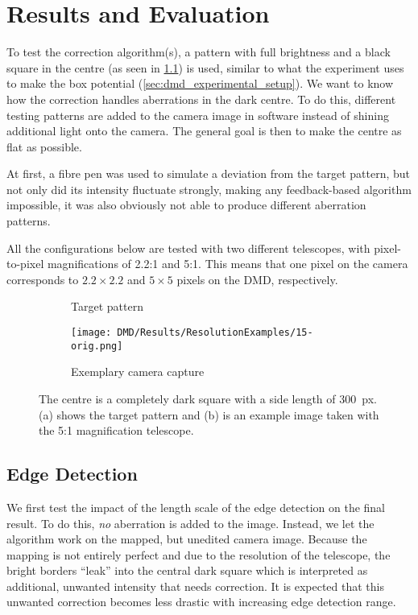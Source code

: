 

\chapter{Results and Evaluation}
To test the correction algorithm(s), a pattern with full brightness and a black square in the centre (as seen in \cref{fig:dmd_tests_target}) is used, similar to what the experiment uses to make the box potential (\cref{sec:dmd_experimental_setup}). We want to know how the correction handles aberrations in the dark centre. To do this, different testing patterns are added to the camera image in software instead of shining additional light onto the camera. The general goal is then to make the centre as flat as possible.

At first, a fibre pen was used to simulate a deviation from the target pattern, but not only did its intensity fluctuate strongly, making any feedback-based algorithm impossible, it was also obviously not able to produce different aberration patterns.

All the configurations below are tested with two different telescopes, with pixel-to-pixel magnifications of \num{2.2}:1 and \num{5}:1. This means that one pixel on the camera corresponds to $\num{2.2}\times\num{2.2}$ and $\num{5}\times\num{5}$ pixels on the DMD, respectively.
\vfill
\begin{figure}[hbp]
    \centering
    \begin{subfigure}[t]{0.49\textwidth}
        \centering
        \caption{Target pattern}
        \label{fig:dmd_tests_target}
    \end{subfigure}
    \begin{subfigure}[t]{0.49\textwidth}
        \centering
        \texttt{[image: DMD/Results/ResolutionExamples/15-orig.png]}
        \caption{Exemplary camera capture}
    \end{subfigure}
    \caption[Target pattern for the DMD tests]{The centre is a completely dark square with a side length of \SI{300}{px}. (a) shows the target pattern and (b) is an example image taken with the 5:1 magnification telescope.}
\end{figure}


\section{Edge Detection}
\label{sec:results_edgedetection}
We first test the impact of the length scale of the edge detection on the final result. To do this, \emph{no} aberration is added to the image. Instead, we let the algorithm work on the mapped, but unedited camera image.
Because the mapping is not entirely perfect and due to the resolution of the telescope, the bright borders \enquote{leak} into the central dark square which is interpreted as additional, unwanted intensity that needs correction. It is expected that this unwanted correction becomes less drastic with increasing edge detection range.

